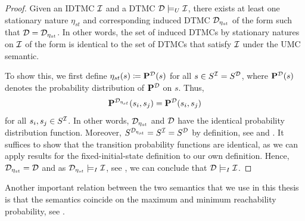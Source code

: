 \begin{proof}
    Given an IDTMC $\mathcal{I}$ and a DTMC $\mathcal{D} \models_U \mathcal{I}$, there exists at least one stationary nature $\eta_{st}$ and corresponding induced DTMC $\mathcal{D}_{\eta_{st}}$ of the form  such that $\mathcal{D} = \mathcal{D}_{\eta_{st}}$.
    In other words, the set of induced DTMCs by stationary natures on $\mathcal{I}$ of the form  is identical to the set of DTMCs that satisfy $\mathcal{I}$ under the UMC semantic.

    To show this, we first define $\eta_{st}(s) \coloneq \mathbf{P}^{\mathcal{D}}(s)$ for all $s \in S^{\mathcal{I}} = S^{\mathcal{D}}$, where $\mathbf{P}^{\mathcal{D}}(s)$ denotes the probability distribution of $\mathbf{P}^{\mathcal{D}}$ on $s$. Thus, 
    \[\mathbf{P}^{\mathcal{D}_{\eta_{st}}}(s_i,s_j) = \mathbf{P}^{\mathcal{D}}(s_i,s_j)\]
    for all $s_i,s_j\in S^{\mathcal{I}}$. In other words, $\mathcal{D}_{\eta_{st}}$ and $\mathcal{D}$ have the identical probability distribution function.
    Moreover, $S^{\mathcal{D}_{\eta_{st}}} = S^{\mathcal{I}} = S^{\mathcal{D}}$ by definition, see  and .
    It suffices to show that the transition probability functions are identical, as we can apply results for the fixed-initial-state definition to our own definition. Hence, $\mathcal{D}_{\eta_{st}} = \mathcal{D}$ and as $\mathcal{D}_{\eta_{st}} \models_I \mathcal{I}$, see , we can conclude that $\mathcal{D} \models_I \mathcal{I}$.
\end{proof}


Another important relation between the two semantics that we use in this thesis is that the semantics coincide on the maximum and minimum reachability probability, see \cite{reachability_in_pIMCs_using_constraints,complexity_model_checking_interval-valued_DTMCs}.
